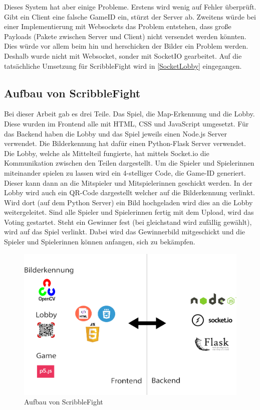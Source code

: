 Dieses System hat aber einige Probleme. Erstens wird wenig auf Fehler überprüft.
Gibt ein Client eine falsche GameID ein, stürzt der Server ab. Zweitens würde bei einer Implementierung mit 
Websockets das Problem entstehen, dass große Payloads (Pakete zwischen Server und Client) nicht versendet werden könnten.
Dies würde vor allem beim hin und herschicken der Bilder ein Problem werden. Deshalb wurde 
nicht mit Websocket, sonder mit SocketIO gearbeitet. Auf die tatsächliche Umsetzung für ScribbleFight wird in 
\ref{SocketLobby} eingegangen. 

\subsection{Aufbau von ScribbleFight}
Bei dieser Arbeit gab es drei Teile. Das Spiel, die Map-Erkennung und die Lobby. Diese wurden im Frontend alle mit HTML, CSS und JavaScript umgesetzt. 
Für das Backend haben die Lobby und das Spiel jeweils einen Node.js Server verwendet. Die Bilderkennung hat dafür einen Python-Flask Server verwendet. Die Lobby, welche als Mittelteil fungierte, hat mittels Socket.io die Kommunikation zwischen den Teilen dargestellt. 
Um die Spieler und Spielerinnen miteinander spielen zu lassen wird ein 4-stelliger Code, die Game-ID generiert. Dieser kann dann an die Mitspieler und Mitspielerinnen geschickt werden. In der Lobby wird auch ein QR-Code dargestellt welcher auf die Bilderkennung verlinkt. 
Wird dort (auf dem Python Server) ein Bild hochgeladen wird dies an die Lobby weitergeleitet. Sind alle Spieler und Spielerinnen fertig mit dem Upload, wird das Voting gestartet. Steht ein Gewinner fest (bei gleichstand wird zufällig gewählt), wird auf das Spiel verlinkt. Dabei wird das Gewinnerbild mitgeschickt und die Spieler und Spielerinnen können anfangen, sich zu bekämpfen.
\begin{figure}[H]
    \centering
    \includegraphics[scale=0.3]{pics/architektur.png}
    \caption{Aufbau von ScribbleFight}
\end{figure}  

